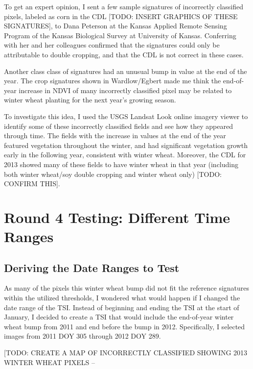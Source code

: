 To get an expert opinion, I sent a few sample signatures of incorrectly classified pixels, labeled as corn in the CDL [TODO: INSERT GRAPHICS OF THESE SIGNATURES], to Dana Peterson at the Kansas Applied Remote Sensing Program of the Kansas Biological Survey at University of Kansas. Conferring with her and her colleagues confirmed that the signatures could only be attributable to double cropping, and that the CDL is not correct in these cases.

Another class class of signatures had an unusual bump in value at the end of the year. The crop signatures shown in Wardlow/Egbert made me think the end-of-year increase in NDVI of many incorrectly classified pixel may be related to winter wheat planting for the next year’s growing season.

To investigate this idea, I used the USGS Landsat Look online imagery viewer to identify some of these incorrectly classified fields and see how they appeared through time. The fields with the increase in values at the end of the year featured vegetation throughout the winter, and had significant vegetation growth early in the following year, consistent with winter wheat. Moreover, the CDL for 2013 showed many of these fields to have winter wheat in that year (including both winter wheat/soy double cropping and winter wheat only) [TODO: CONFIRM THIS].

\section{Round 4 Testing: Different Time Ranges}

\subsection*{Deriving the Date Ranges to Test}

As many of the pixels this winter wheat bump did not fit the reference signatures within the utilized thresholds, I wondered what would happen if I changed the date range of the TSI. Instead of beginning and ending the TSI at the start of January, I decided to create a TSI that would include the end-of-year winter wheat bump from 2011 and end before the bump in 2012. Specifically, I selected images from 2011 DOY 305 through 2012 DOY 289.

[TODO: CREATE A MAP OF INCORRECTLY CLASSIFIED SHOWING 2013 WINTER WHEAT PIXELS -- %


